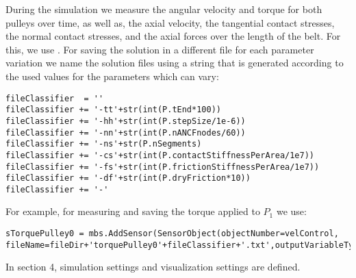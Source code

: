 \item{During the simulation we measure the angular velocity and torque for both pulleys over time, as well as, the axial velocity, the tangential contact stresses, the normal contact stresses, and the axial forces over the length of the belt. For this, we use . For saving the solution in a different file for each parameter variation we name the solution files using a string that is generated according to the used values for the parameters which can vary:
\pythonstyle
\begin{tcolorbox}\begin{lstlisting}
fileClassifier  = ''
fileClassifier += '-tt'+str(int(P.tEnd*100))
fileClassifier += '-hh'+str(int(P.stepSize/1e-6))
fileClassifier += '-nn'+str(int(P.nANCFnodes/60))
fileClassifier += '-ns'+str(P.nSegments)
fileClassifier += '-cs'+str(int(P.contactStiffnessPerArea/1e7))
fileClassifier += '-fs'+str(int(P.frictionStiffnessPerArea/1e7))
fileClassifier += '-df'+str(int(P.dryFriction*10))
fileClassifier += '-' 
\end{lstlisting}\end{tcolorbox} 
For example, for measuring and saving the torque applied to $P_1$ we use:
\pythonstyle
\begin{tcolorbox}\begin{lstlisting}
sTorquePulley0 = mbs.AddSensor(SensorObject(objectNumber=velControl, fileName=fileDir+'torquePulley0'+fileClassifier+'.txt',outputVariableType=exu.OutputVariableType.Force))
\end{lstlisting}\end{tcolorbox}
}    
\ei
\item{In section 4, simulation settings and visualization settings are defined.}
